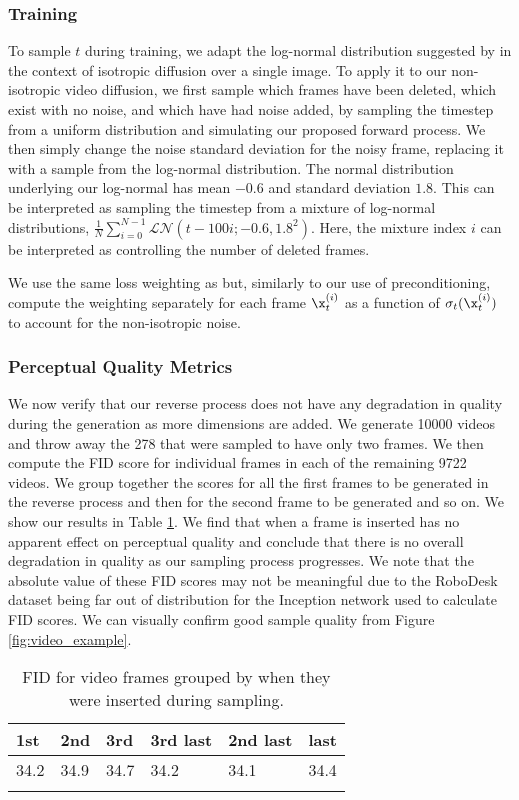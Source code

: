 \subsubsection{Training}
To sample $t$ during training, we adapt the log-normal distribution suggested by \cite{karraselucidating2022} in the context of isotropic diffusion over a single image. To apply it to our non-isotropic video diffusion, we first sample which frames have been deleted, which exist with no noise, and which have had noise added, by sampling the timestep from a uniform distribution and simulating our proposed forward process. We then simply change the noise standard deviation for the noisy frame, replacing it with a sample from the log-normal distribution. The normal distribution underlying our log-normal has mean $-0.6$ and standard deviation $1.8$. 
%
This can be interpreted as sampling the timestep from a mixture of log-normal distributions, $\frac{1}{N}\sum_{i=0}^{N-1} \mathcal{LN}(t-100i; -0.6, 1.8^2)$. Here, the mixture index $i$ can be interpreted as controlling the number of deleted frames.

We use the same loss weighting as \cite{karraselucidating2022} but, similarly to our use of preconditioning, compute the weighting separately for each frame $\x_t^{(i)}$ as a function of $\sigma_t(\x_t^{(i)})$ to account for the non-isotropic noise.

\subsubsection{Perceptual Quality Metrics}
We now verify that our reverse process does not have any degradation in quality during the generation as more dimensions are added. We generate 10000 videos and throw away the 278 that were sampled to have only two frames. We then compute the FID score for individual frames in each of the remaining 9722 videos. We group together the scores for all the first frames to be generated in the reverse process and then for the second frame to be generated and so on. We show our results in Table \ref{tab:fid-by-insertion-order}. We find that when a frame is inserted has no apparent effect on perceptual quality and conclude that there is no overall degradation in quality as our sampling process progresses. We note that the absolute value of these FID scores may not be meaningful due to the RoboDesk dataset being far out of distribution for the Inception network used to calculate FID scores. We can visually confirm good sample quality from Figure \ref{fig:video_example}.
\begin{table}[h]
\centering
\caption{FID for video frames grouped by when they were inserted during sampling.}
\begin{tabular}{p{1.5cm}p{1.5cm}p{1.5cm}|p{1.5cm}p{1.5cm}p{1.5cm}}
\toprule
1st & 2nd & 3rd & 3rd last & 2nd last & last \\
\midrule
34.2 & 34.9 & 34.7 & 34.2 & 34.1 & 34.4 \\
\bottomrule
\label{tab:fid-by-insertion-order}
\end{tabular}
\end{table}